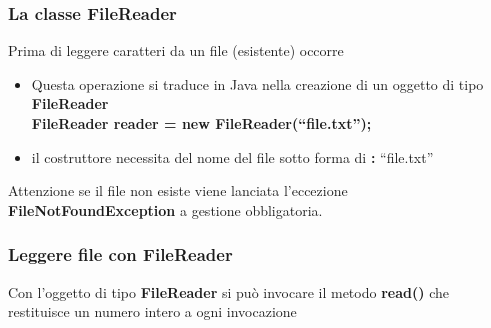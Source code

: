 \begin{frame}
\frametitle{La classe FileReader}
\begin{block}{}
Prima di leggere caratteri da un file (esistente) occorre \textbf{}	
\begin{itemize}
\item Questa operazione si traduce in Java nella creazione di un oggetto di tipo \textbf{FileReader}\\
\hspace{0.8cm}\textbf{FileReader reader = new FileReader(``file.txt'');}
\item il costruttore necessita del nome del file sotto forma di \textbf{:} ``file.txt''
\end{itemize}
\end{block}
\begin{block}{Attenzione}
se il file non esiste viene lanciata l'eccezione \textbf{FileNotFoundException} a gestione obbligatoria.
\end{block}
\end{frame}

\begin{frame}
\frametitle{Leggere file con FileReader}
\begin{block}{}
Con l'oggetto di tipo \textbf{FileReader} si può invocare il metodo \textbf{read()} che restituisce un numero intero a ogni 
invocazione
\end{block}
\end{frame}